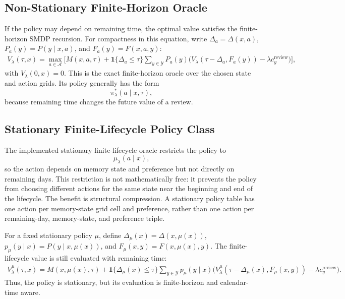 \documentclass[11pt]{article}
\begin{document}
\subsection{Non-Stationary Finite-Horizon Oracle}

If the policy may depend on remaining time, the optimal value satisfies the finite-horizon SMDP recursion. For compactness in this equation, write \(\Delta_a=\Delta(x,a)\), \(P_a(y)=P(y\mid x,a)\), and \(F_a(y)=F(x,a,y)\):
\begin{align}
V_\lambda(\tau,x)
=
\max_{a\in\mathcal{A}}
\Bigg[
M(x,a,\tau)
+
\mathbf{1}\{\Delta_a\le\tau\}
\sum_{y\in\mathcal{Y}} P_a(y)
\Big(
V_\lambda(\tau-\Delta_a,F_a(y))
-\lambda c_y^{\mathrm{review}}
\Big)
\Bigg],
\label{eq:finite-oracle}
\end{align}
with \(V_\lambda(0,x)=0\). This is the exact finite-horizon oracle over the chosen state and action grids. Its policy generally has the form
\[
\pi_\lambda^*(a\mid x,\tau),
\]
because remaining time changes the future value of a review.

\subsection{Stationary Finite-Lifecycle Policy Class}

The implemented stationary finite-lifecycle oracle restricts the policy to
\[
\mu_\lambda(a\mid x),
\]
so the action depends on memory state and preference but not directly on remaining days. This restriction is not mathematically free: it prevents the policy from choosing different actions for the same state near the beginning and end of the lifecycle. The benefit is structural compression. A stationary policy table has one action per memory-state grid cell and preference, rather than one action per remaining-day, memory-state, and preference triple.

For a fixed stationary policy \(\mu\), define
\(\Delta_\mu(x)=\Delta(x,\mu(x))\),
\(p_\mu(y\mid x)=P(y\mid x,\mu(x))\), and
\(F_\mu(x,y)=F(x,\mu(x),y)\). The finite-lifecycle value is still evaluated with remaining time:
\begin{align}
V_\lambda^\mu(\tau,x)
=
M(x,\mu(x),\tau)
+
\mathbf{1}\{\Delta_\mu(x)\le\tau\}
\sum_{y\in\mathcal{Y}} p_\mu(y\mid x)
\Big(
V_\lambda^\mu(\tau-\Delta_\mu(x),F_\mu(x,y))
-\lambda c_y^{\mathrm{review}}
\Big).
\label{eq:stationary-eval}
\end{align}
Thus, the policy is stationary, but its evaluation is finite-horizon and calendar-time aware.
\end{document}
